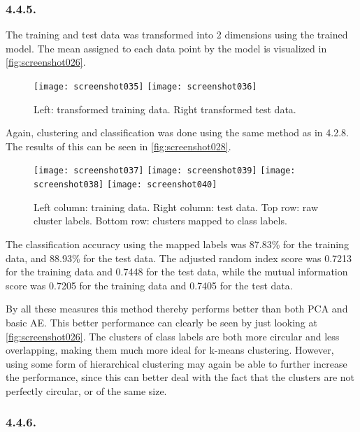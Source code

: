 \documentclass[a4paper, 12pt]{article}
\begin{document}
\subsubsection{4.4.5.}

The training and test data was transformed into 2 dimensions using the trained model. The mean assigned to each data point by the model is visualized in \autoref{fig:screenshot026}.

\begin{figure}[H]
	\centering
	\texttt{[image: screenshot035]}
	\texttt{[image: screenshot036]}
	\caption{Left: transformed training data. Right transformed test data.}
	\label{fig:screenshot026}
\end{figure}

Again, clustering and classification was done using the same method as in 4.2.8. The results of this can be seen in \autoref{fig:screenshot028}.

\begin{figure}[H]
	\centering
	\texttt{[image: screenshot037]}
	\texttt{[image: screenshot039]}
	\texttt{[image: screenshot038]}
	\texttt{[image: screenshot040]}
	\caption{Left column: training data. Right column: test data. Top row: raw cluster labels. Bottom row: clusters mapped to class labels.}
	\label{fig:screenshot028}
\end{figure}

The classification accuracy using the mapped labels was 87.83\% for the training data, and 88.93\% for the test data. The adjusted random index score was 0.7213 for the training data and 0.7448 for the test data, while the mutual information score was 0.7205 for the training data and 0.7405 for the test data.

By all these measures this method thereby performs better than both PCA and basic AE. This better performance can clearly be seen by just looking at \autoref{fig:screenshot026}. The clusters of class labels are both more circular and less overlapping, making them much more ideal for k-means clustering. However, using some form of hierarchical clustering may again be able to further increase the performance, since this can better deal with the fact that the clusters are not perfectly circular, or of the same size.

\subsubsection{4.4.6.}
\end{document}
